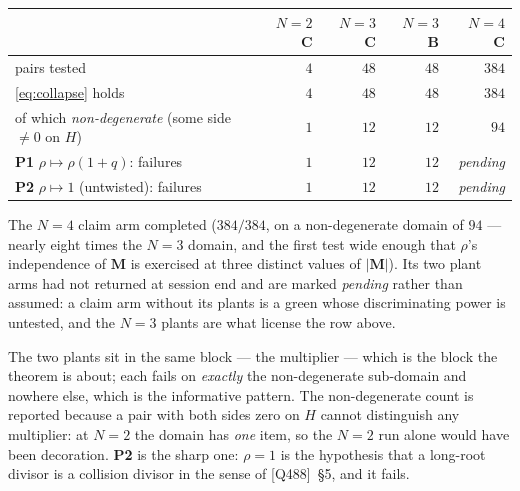\documentclass[11pt]{article}
\theoremstyle{plain}
\theoremstyle{definition}
\theoremstyle{remark}
\theoremstyle{plain}
\newcommand{\bM}{\mathbf{M}}
\begin{document}
\begin{center}
\begin{tabular}{@{}lrrrr@{}}
\toprule
 & $N=2$ C & $N=3$ C & $N=3$ B & $N=4$ C \\
\midrule
pairs tested                        & $4$ & $48$ & $48$ & $384$ \\
\eqref{eq:collapse} holds           & $4$ & $48$ & $48$ & $384$ \\
of which \emph{non-degenerate} (some side $\ne0$ on $H$)
                                    & $1$ & $12$ & $12$ & $94$ \\
\midrule
\textbf{P1} $\rho\mapsto\rho(1+q)$: failures   & $1$ & $12$ & $12$ & \emph{pending} \\
\textbf{P2} $\rho\mapsto1$ (untwisted): failures & $1$ & $12$ & $12$ & \emph{pending} \\
\bottomrule
\end{tabular}
\end{center}

The $N=4$ claim arm completed ($384/384$, on a non-degenerate domain of $94$ ---
nearly eight times the $N=3$ domain, and the first test wide enough that
$\rho$'s independence of $\bM$ is exercised at three distinct values of
$|\bM|$).  Its two plant arms had not returned at session end and are marked
\emph{pending} rather than assumed: a claim arm without its plants is a green
whose discriminating power is untested, and the $N=3$ plants are what license
the row above.

The two plants sit in the same block --- the multiplier --- which is the block
the theorem is about; each fails on \emph{exactly} the non-degenerate
sub-domain and nowhere else, which is the informative pattern.  The
non-degenerate count is reported because a pair with both sides zero on $H$
cannot distinguish any multiplier: at $N=2$ the domain has \emph{one} item, so
the $N=2$ run alone would have been decoration.  \textbf{P2} is the sharp one:
$\rho=1$ is the hypothesis that a long-root divisor is a collision divisor in
the sense of [Q488]~\S5, and it fails.
\end{document}

